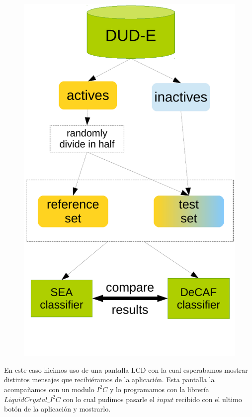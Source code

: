 \documentclass[a0paper,portrait]{baposter}
\begin{document}
\begin{poster}
{\begin{figure}
    \vspace{10pt}
    \begin{center}
        \includegraphics[width=\linewidth]{class}
    \end{center}
\end{figure}

En este caso hicimos uso de una pantalla LCD con la cual esperabamos mostrar distintos mensajes que recibiéramos de la aplicación. Esta pantalla la acompañamos con un modulo $I^2C$ y lo programamos con la librería $LiquidCrystal\_I^2C$ con lo cual pudimos pasarle el $input$ recibido con el ultimo botón de la aplicación y mostrarlo.

}
\end{poster}
\end{document}
